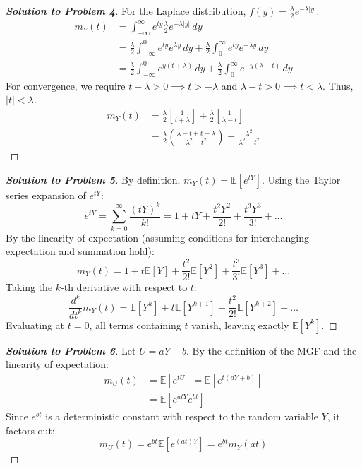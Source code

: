 \documentclass[11pt, a4paper]{article}
\theoremstyle{definition}
\theoremstyle{remark}
\newcommand{\E}{\mathbb{E}}
\begin{document}
\begin{proof}[\textbf{Solution to Problem 4}]
For the Laplace distribution, $f(y) = \frac{\lambda}{2} e^{-\lambda|y|}$.
\begin{align*}
m_Y(t) &= \int_{-\infty}^{\infty} e^{ty} \frac{\lambda}{2} e^{-\lambda|y|} \, dy \\
&= \frac{\lambda}{2} \int_{-\infty}^{0} e^{ty} e^{\lambda y} \, dy + \frac{\lambda}{2} \int_{0}^{\infty} e^{ty} e^{-\lambda y} \, dy \\
&= \frac{\lambda}{2} \int_{-\infty}^{0} e^{y(t+\lambda)} \, dy + \frac{\lambda}{2} \int_{0}^{\infty} e^{-y(\lambda-t)} \, dy
\end{align*}
For convergence, we require $t+\lambda > 0 \implies t > -\lambda$ and $\lambda-t > 0 \implies t < \lambda$. Thus, $|t| < \lambda$.
\begin{align*}
m_Y(t) &= \frac{\lambda}{2} \left[ \frac{1}{t+\lambda} \right] + \frac{\lambda}{2} \left[ \frac{1}{\lambda-t} \right] \\
&= \frac{\lambda}{2} \left( \frac{\lambda-t + t+\lambda}{\lambda^2 - t^2} \right) = \frac{\lambda^2}{\lambda^2 - t^2}
\end{align*}
\end{proof}

\begin{proof}[\textbf{Solution to Problem 5}]
By definition, $m_Y(t) = \E[e^{tY}]$. Using the Taylor series expansion of $e^{tY}$:
\[ e^{tY} = \sum_{k=0}^{\infty} \frac{(tY)^k}{k!} = 1 + tY + \frac{t^2Y^2}{2!} + \frac{t^3Y^3}{3!} + \dots \]
By the linearity of expectation (assuming conditions for interchanging expectation and summation hold):
\[ m_Y(t) = 1 + t\E[Y] + \frac{t^2}{2!}\E[Y^2] + \frac{t^3}{3!}\E[Y^3] + \dots \]
Taking the $k$-th derivative with respect to $t$:
\[ \frac{d^k}{dt^k} m_Y(t) = \E[Y^k] + t\E[Y^{k+1}] + \frac{t^2}{2!}\E[Y^{k+2}] + \dots \]
Evaluating at $t=0$, all terms containing $t$ vanish, leaving exactly $\E[Y^k]$.
\end{proof}

\begin{proof}[\textbf{Solution to Problem 6}]
Let $U = aY + b$. By the definition of the MGF and the linearity of expectation:
\begin{align*}
m_U(t) &= \E[e^{tU}] = \E[e^{t(aY+b)}] \\
&= \E[e^{atY} e^{bt}]
\end{align*}
Since $e^{bt}$ is a deterministic constant with respect to the random variable $Y$, it factors out:
\[ m_U(t) = e^{bt} \E[e^{(at)Y}] = e^{bt} m_Y(at) \]
\end{proof}
\end{document}
